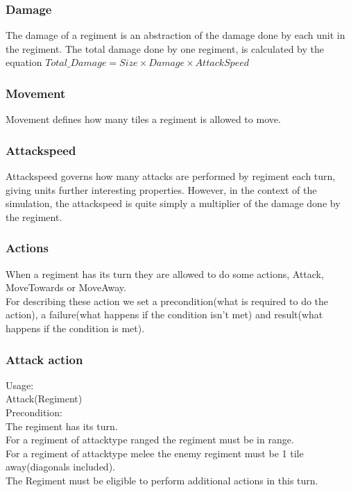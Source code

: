 		\subsubsection{Damage}
		The damage of a regiment is an abstraction of the damage done by each unit in the regiment. 
		The total damage done by one regiment, is calculated by the equation $Total\_Damage = Size \times Damage \times AttackSpeed$
		
		\subsubsection{Movement}
		Movement defines how many tiles a regiment is allowed to move.
		
		\subsubsection{Attackspeed}
		Attackspeed governs how many attacks are performed by regiment each turn, giving units further interesting properties. 
		However, in the context of the simulation, the attackspeed is quite simply a multiplier of the damage done by the regiment.
		
		\subsubsection{Actions}
		When a regiment has its turn they are allowed to do some actions, Attack, MoveTowards or MoveAway. \\
		For describing these action we set a precondition(what is required to do the action), a failure(what happens if the condition isn't met)
		and result(what happens if the condition is met).
		
		\subsubsection{Attack action}
		Usage: \\
		Attack(Regiment) \\
		
		Precondition: \\
		The regiment has its turn. \\
		For a regiment of attacktype ranged the regiment must be in range. \\
		For a regiment of attacktype melee the enemy regiment must be 1 tile away(diagonals included). \\
		The Regiment must be eligible to perform additional actions in this turn.\\
		

